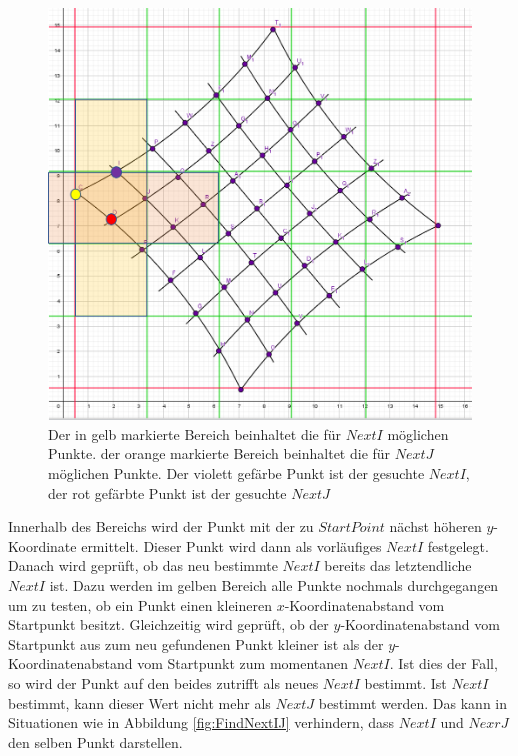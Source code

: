\begin{figure}[!htb]
	\centering
	\includegraphics[width=0.6\linewidth]{images/VerzeichnetesSchachbrett_2.png}
	\caption[Finden der Startvektoren in Schachbrettpunkten]{Der in gelb markierte Bereich beinhaltet die für $NextI$ möglichen Punkte. der orange markierte Bereich beinhaltet die für $NextJ$ möglichen Punkte. Der violett gefärbe Punkt ist der gesuchte $NextI$, der rot gefärbte Punkt ist der gesuchte $NextJ$}
	\label{fig:NextINextJ}
\end{figure}


%

Innerhalb des Bereichs wird der Punkt mit der zu $StartPoint$ nächst höheren $y$-Koordinate ermittelt. Dieser Punkt wird dann als vorläufiges $NextI$ festgelegt. Danach wird geprüft, ob das neu bestimmte $NextI$ bereits das letztendliche $NextI$ ist. Dazu werden im gelben Bereich alle Punkte nochmals durchgegangen um zu testen, ob ein Punkt einen kleineren $x$-Koordinatenabstand vom Startpunkt besitzt. Gleichzeitig wird geprüft, ob der $y$-Koordinatenabstand vom Startpunkt aus zum neu gefundenen Punkt kleiner ist als der $y$-Koordinatenabstand vom Startpunkt zum momentanen $NextI$.  Ist dies der Fall, so wird der Punkt auf den beides zutrifft als neues $NextI$ bestimmt. Ist $NextI$ bestimmt, kann dieser Wert nicht mehr als $NextJ$ bestimmt werden. Das kann in Situationen wie in Abbildung \ref{fig:FindNextIJ} verhindern, dass $NextI$ und $NexrJ$ den selben Punkt darstellen.\\
%

